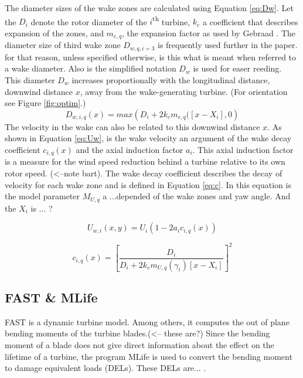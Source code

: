 The diameter sizes of the wake zones are calculated using Equation \ref{eq:Dw}. Let the $D_i$ denote the rotor diameter of the $i${\textsuperscript{th}} turbine, $k_e$ a coefficient that describes expansion of the zones, and $m_{e,q}$, the expansion factor as used by Gebraad \cite{Gebraad2016}. The diameter size of third wake zone $D_{w,q,i=3}$ is frequently used further in the paper. for that reason, unless specified otherwise, is this what is meant when referred to a wake diameter. Also is the simplified notation $D_w$ is used for easer reeding. This diameter $D_w$ increases proportionally with the longitudinal distance, downwind distance $x$, away from the wake-generating turbine. (For orientation see Figure \ref{fig:optim}.)
\begin{equation}
\label{eq:Dw}
D_{w,i,q}(x) = max({D_i + 2k_em_{e,q}([x - X_i],0} )
\end{equation}
The velocity in the wake can also be related to this downwind distance $x$. As shown in Equation \ref{eq:Uw}, is the wake velocity an argument of the wake decay coefficient $c_{i,q}(x)$ and the axial induction factor $a_i$. This axial induction factor is a measure for the wind speed reduction behind a turbine relative to its own rotor speed. (<--note bart). The wake decay coefficient describes the decay of velocity for each wake zone and is defined in Equation \ref{eq:c}. In this equation is the model parameter $M_{U,q}$ a ...depended of the wake zones and yaw angle\cite{Gebraad2016}. And the $X_i$ is ... ?

\begin{equation}
\label{eq:Uw}
U_{w,i}(x,y) = U_i\left( {1-2a_{i}c_{i,q}(x)} \right)
\end{equation} 

\begin{equation}
\label{eq:c}
c_{i,q}(x) = \left[ \frac{D_i}{D_i + 2k_em_{U,q}(\gamma_i)[x - X_i]} \right]^2
\end{equation}



\subsection{FAST \& MLife} FAST is a dynamic turbine model\cite{Jonkman2005}. Among others, it computes the out of plane bending moments of the turbine blades.(<-- these are?) Since the bending moment of a blade does not give direct information about the effect on the lifetime of a turbine, the program MLife is used to convert the bending moment to damage equivalent loads (DELs). These DELs are... \cite{Mlife}.



